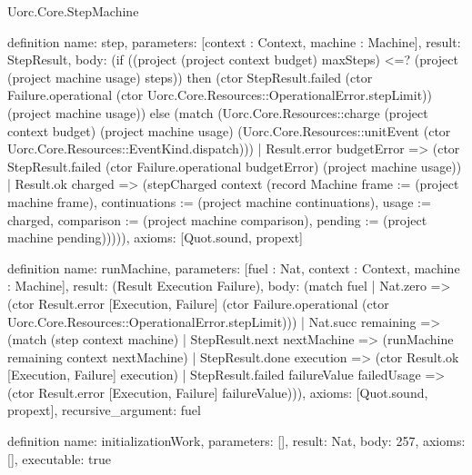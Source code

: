 \begin{lexlean}{Uorc.Core.StepMachine}
\begin{semanticmodule}
definition{
  name: step,
  parameters: [context : Context, machine : Machine],
  result: StepResult,
  body: (if ((project (project context budget) maxSteps) <=? (project (project machine usage) steps)) then (ctor StepResult.failed (ctor Failure.operational (ctor Uorc.Core.Resources::OperationalError.stepLimit)) (project machine usage)) else (match (Uorc.Core.Resources::charge (project context budget) (project machine usage) (Uorc.Core.Resources::unitEvent (ctor Uorc.Core.Resources::EventKind.dispatch)))
    | Result.error budgetError => (ctor StepResult.failed (ctor Failure.operational budgetError) (project machine usage))
    | Result.ok charged => (stepCharged context (record Machine {frame := (project machine frame), continuations := (project machine continuations), usage := charged, comparison := (project machine comparison), pending := (project machine pending)})))),
  axioms: [Quot.sound, propext]
}

definition{
  name: runMachine,
  parameters: [fuel : Nat, context : Context, machine : Machine],
  result: (Result Execution Failure),
  body: (match fuel
    | Nat.zero => (ctor Result.error [Execution, Failure] (ctor Failure.operational (ctor Uorc.Core.Resources::OperationalError.stepLimit)))
    | Nat.succ remaining => (match (step context machine)
      | StepResult.next nextMachine => (runMachine remaining context nextMachine)
      | StepResult.done execution => (ctor Result.ok [Execution, Failure] execution)
      | StepResult.failed failureValue failedUsage => (ctor Result.error [Execution, Failure] failureValue))),
  axioms: [Quot.sound, propext],
  recursive_argument: fuel
}

definition{
  name: initializationWork,
  parameters: [],
  result: Nat,
  body: 257,
  axioms: [],
  executable: true
}


\end{semanticmodule}
\end{lexlean}
